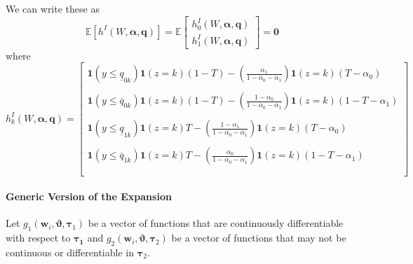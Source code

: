 We can write these as 
\[
  \mathbb{E}[h^I(W,\boldsymbol{\alpha}, \mathbf{q})] = \mathbb{E}
  \left[
  \begin{array}{c}
    h^I_{0}(W,\boldsymbol{\alpha}, \mathbf{q})\\
    h^I_{1}(W,\boldsymbol{\alpha}, \mathbf{q})
  \end{array}
\right] = \mathbf{0}
\]
where
\[
  h_k^I(W,\boldsymbol{\alpha},\mathbf{q}) = \left[
  \begin{array}{c}
    \mathbf{1}(y \leq \underline{q}_{0k}) \mathbf{1}(z=k)(1 - T) 
    - \displaystyle \left( \frac{\alpha_1}{1 - \alpha_0 - \alpha_1} \right) \mathbf{1}(z=k)(T-\alpha_0)\\ \\
    \mathbf{1}(y \leq \overline{q}_{0k}) \mathbf{1}(z=k)(1 - T)
    - \displaystyle \left( \frac{1 - \alpha_0}{1 - \alpha_0 - \alpha_1} \right) \mathbf{1}(z=k)(1 - T-\alpha_1)\\ \\
    \mathbf{1}(y \leq \underline{q}_{1k}) \mathbf{1}(z=k)T
    - \displaystyle \left( \frac{1 - \alpha_1}{1 - \alpha_0 - \alpha_1} \right) \mathbf{1}(z=k)(T-\alpha_0)\\ \\
    \mathbf{1}(y \leq \overline{q}_{1k}) \mathbf{1}(z=k)T 
    - \displaystyle \left( \frac{\alpha_0}{1 - \alpha_0 - \alpha_1} \right) \mathbf{1}(z=k)(1 - T-\alpha_1)\\ \\
  \end{array}
\right]
\]

\paragraph{Generic Version of the Expansion}

Let $g_1(\mathbf{w}_i,\boldsymbol{\vartheta}, \boldsymbol{\tau}_1)$ be a vector of functions that are continuously differentiable with respect to $\boldsymbol{\tau_1}$ and $g_2(\mathbf{w}_i,\boldsymbol{\vartheta}, \boldsymbol{\tau}_2)$ be a vector of functions that may not be continuous or differentiable in $\boldsymbol{\tau}_2$.


